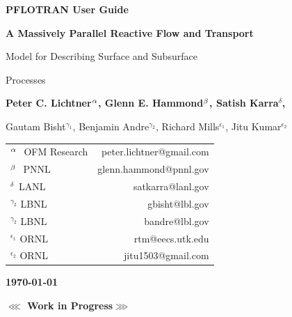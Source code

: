 \begin{center}

\dblline

\vspace{0.5 cm}

{\bf\huge PFLOTRAN User Guide}

\vspace{0.5cm}

{\bf\LARGE A Massively Parallel Reactive Flow and Transport 

Model for Describing Surface and Subsurface 

Processes}

\vspace{0.5cm}

{\bf\large Peter C. Lichtner${^{\alpha}}$, Glenn E. Hammond${^{\beta}}$, Satish Karra${^\delta}$, 

Gautam Bisht$^{\gamma_1}$, Benjamin Andre$^{\gamma_2}$, Richard Mills$^{\epsilon_1}$, Jitu Kumar$^{\epsilon_2}$}

\vspace{0.5cm}

\begin{tabular}{lr}
$^{{\alpha}_{~}}$ OFM Research & peter.lichtner@gmail.com\\
$^{{\beta}_{~}}$ PNNL & glenn.hammond@pnnl.gov\\
$^{\delta_{~}}$ LANL & satkarra@lanl.gov\\
$^{\gamma_2}$ LBNL & gbisht@lbl.gov\\
$^{\gamma_2}$ LBNL & bandre@lbl.gov\\
$^{\epsilon_1}$ ORNL & rtm@eecs.utk.edu \\
$^{\epsilon_2}$ ORNL & jitu1503@gmail.com
\end{tabular}

\vspace{0.5cm}

{\bf\large\today}


\vspace{1cm}

{\bf\LARGE $\lll$ Work in Progress$\ggg$}

\vspace{1cm}

\end{center}

